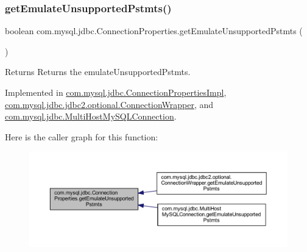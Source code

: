 \subsubsection{\texorpdfstring{get\+Emulate\+Unsupported\+Pstmts()}{getEmulateUnsupportedPstmts()}}
{\footnotesize\ttfamily boolean com.\+mysql.\+jdbc.\+Connection\+Properties.\+get\+Emulate\+Unsupported\+Pstmts (\begin{DoxyParamCaption}{ }\end{DoxyParamCaption})}

\begin{DoxyReturn}{Returns}
Returns the emulate\+Unsupported\+Pstmts. 
\end{DoxyReturn}


Implemented in \mbox{\hyperlink{classcom_1_1mysql_1_1jdbc_1_1_connection_properties_impl_a20532164c4c808ec72758e2c9f6e96a7}{com.\+mysql.\+jdbc.\+Connection\+Properties\+Impl}}, \mbox{\hyperlink{classcom_1_1mysql_1_1jdbc_1_1jdbc2_1_1optional_1_1_connection_wrapper_a778c594d3f6f04b555615834c7287ac3}{com.\+mysql.\+jdbc.\+jdbc2.\+optional.\+Connection\+Wrapper}}, and \mbox{\hyperlink{classcom_1_1mysql_1_1jdbc_1_1_multi_host_my_s_q_l_connection_a5c70d20e73b7ab4a471129a0f3c194fe}{com.\+mysql.\+jdbc.\+Multi\+Host\+My\+S\+Q\+L\+Connection}}.

Here is the caller graph for this function\+:\nopagebreak
\begin{figure}[H]
\begin{center}
\leavevmode
\includegraphics[width=350pt]{interfacecom_1_1mysql_1_1jdbc_1_1_connection_properties_ac13c3eab30955ea55dcf84333aeb730f_icgraph}
\end{center}
\end{figure}
\mbox{\label{interfacecom_1_1mysql_1_1jdbc_1_1_connection_properties_accdc773d99a84b7b1db522aa324d6084}} 
